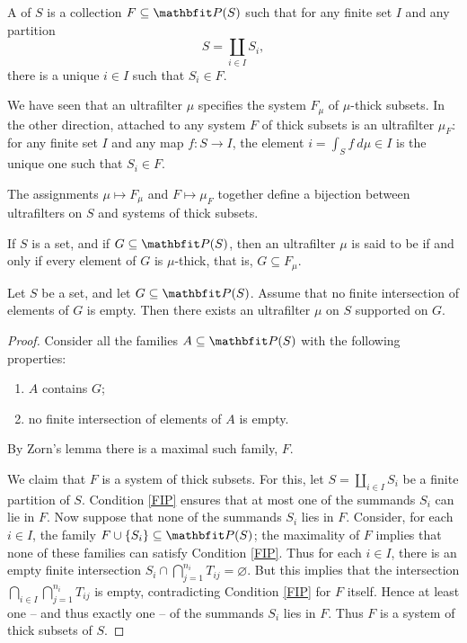 \begin{dfn}
	A  of $ S $ is a collection $ F \subseteq \PP(S) $ such that for any finite set $ I $ and any partition
	\[
		S = \coprod_{ i \in I } S_i \comma
	\]
	there is a unique $ i \in I $ such that $ S_i \in F $.
\end{dfn}

\begin{cnstr}
	We have seen that an ultrafilter $ \mu $ specifies the system $ F_{\mu} $ of $ \mu $-thick subsets.
	In the other direction, attached to any system $F$ of thick subsets is an ultrafilter $\mu_F$: for any finite set $ I $ and any map $ f \colon S \to I $, the element $ i = \int_S f \ d \mu \in I $ is the unique one such that $ S_i \in F$.

	The assignments $ \mu \mapsto F_{\mu} $ and $ F \mapsto \mu_F $ together define a bijection between ultrafilters on $S$ and systems of thick subsets.
\end{cnstr}

\begin{dfn}
	If $ S $ is a set, and if $ G \subseteq \PP(S) $, then an ultrafilter $ \mu $ is said to be  if and only if every element of $G$ is $ \mu $-thick, that is, $ G \subseteq F_{\mu} $.
\end{dfn}

\begin{lem} \label{generateultrafilters}
	Let $ S $ be a set, and let $ G \subseteq \PP(S) $.
	Assume that no finite intersection of elements of $ G $ is empty.
	Then there exists an ultrafilter $ \mu $ on $ S $ supported on $ G $.
\end{lem}

\begin{proof}
	Consider all the families $ A \subseteq \PP(S) $ with the following properties:
	\begin{enumerate}[(1)]
		\item $ A $ contains $ G $;
		\item \label{FIP} no finite intersection of elements of $ A $ is empty.
	\end{enumerate}
	By Zorn's lemma there is a maximal such family, $ F $.

	We claim that $ F $ is a system of thick subsets.
	For this, let $ S = \coprod_{i \in I} S_i $ be a finite partition of $ S $.
	Condition \ref{FIP} ensures that at most one of the summands $ S_i $ can lie in $ F $.
	Now suppose that none of the summands $ S_i $ lies in $ F $.
	Consider, for each $ i \in I $, the family $ F \cup \{ S_i \} \subseteq \PP(S) $;
	the maximality of $ F $ implies that none of these families can satisfy Condition \ref{FIP}.
	Thus for each $ i \in I $, there is an empty finite intersection
	$S_i \cap \bigcap_{j = 1}^{n_i} T_{ij} = \varnothing $.
	But this implies that the intersection $ \bigcap_{i \in I}\bigcap_{j = 1}^{n_i} T_{ij} $ is empty, contradicting Condition \ref{FIP} for $ F $ itself.
	Hence at least one -- and thus exactly one -- of the summands $ S_i $ lies in $ F $.
	Thus $ F $ is a system of thick subsets of $ S $.
\end{proof}

